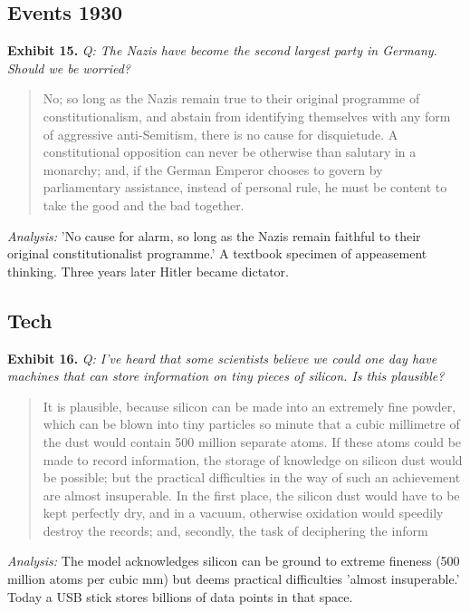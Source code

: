 \documentclass[11pt]{article}
\begin{document}
\subsection*{Events 1930}

\noindent\textbf{Exhibit 15.} \textit{Q: The Nazis have become the second largest party in Germany. Should we be worried?}

\begin{quote}
\small No; so long as the Nazis remain true to their original programme of constitutionalism, and abstain from identifying themselves with any form of aggressive anti-Semitism, there is no cause for disquietude. A constitutional opposition can never be otherwise than salutary in a monarchy; and, if the German Emperor chooses to govern by parliamentary assistance, instead of personal rule, he must be content to take the good and the bad together.
\end{quote}
\noindent\textit{Analysis:} 'No cause for alarm, so long as the Nazis remain faithful to their original constitutionalist programme.' A textbook specimen of appeasement thinking. Three years later Hitler became dictator.

\subsection*{Tech}

\noindent\textbf{Exhibit 16.} \textit{Q: I've heard that some scientists believe we could one day have machines that can store information on tiny pieces of silicon. Is this plausible?}

\begin{quote}
\small It is plausible, because silicon can be made into an extremely fine powder, which can be blown into tiny particles so minute that a cubic millimetre of the dust would contain 500 million separate atoms. If these atoms could be made to record information, the storage of knowledge on silicon dust would be possible; but the practical difficulties in the way of such an achievement are almost insuperable. In the first place, the silicon dust would have to be kept perfectly dry, and in a vacuum, otherwise oxidation would speedily destroy the records; and, secondly, the task of deciphering the inform
\end{quote}
\noindent\textit{Analysis:} The model acknowledges silicon can be ground to extreme fineness (500 million atoms per cubic mm) but deems practical difficulties 'almost insuperable.' Today a USB stick stores billions of data points in that space.
\end{document}
